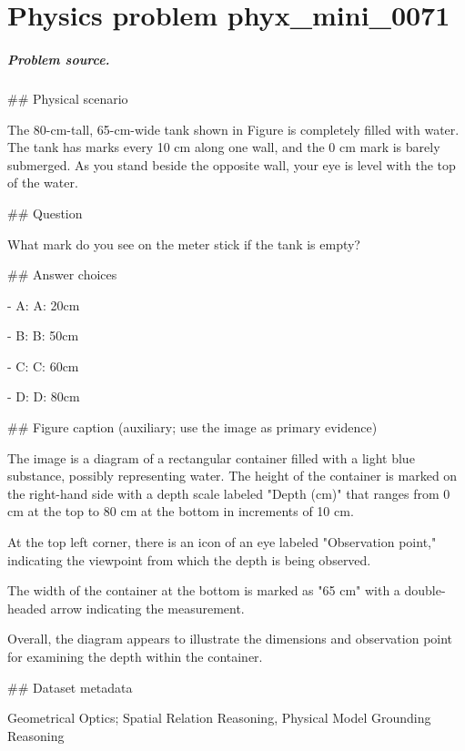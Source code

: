 
\chapter{Physics problem phyx\_mini\_0071}
\label{ch:PhyXMiniProblems_problem_phyx_mini_0071}

\paragraph{Problem source.}
\#\# Physical scenario

The 80-cm-tall, 65-cm-wide tank shown in Figure is completely filled with water. The tank has marks every 10 cm along one wall, and the 0 cm mark is barely submerged. As you stand beside the opposite wall, your eye is level with the top of the water.

\#\# Question

What mark do you see on the meter stick if the tank is empty?

\#\# Answer choices

- A: A: 20cm

- B: B: 50cm

- C: C: 60cm

- D: D: 80cm

\#\# Figure caption (auxiliary; use the image as primary evidence)

The image is a diagram of a rectangular container filled with a light blue substance, possibly representing water. The height of the container is marked on the right-hand side with a depth scale labeled "Depth (cm)" that ranges from 0 cm at the top to 80 cm at the bottom in increments of 10 cm.

At the top left corner, there is an icon of an eye labeled "Observation point," indicating the viewpoint from which the depth is being observed. 

The width of the container at the bottom is marked as "65 cm" with a double-headed arrow indicating the measurement.

Overall, the diagram appears to illustrate the dimensions and observation point for examining the depth within the container.

\#\# Dataset metadata

Geometrical Optics; Spatial Relation Reasoning, Physical Model Grounding Reasoning

